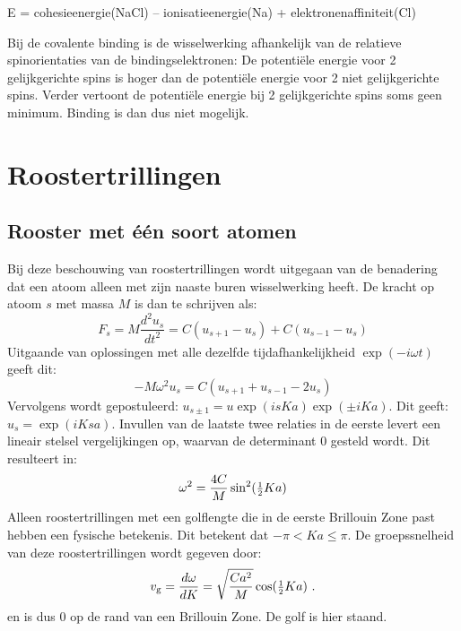 \documentclass[twoside]{report}
\begin{document}
\centerline{E = cohesieenergie(NaCl) -- ionisatieenergie(Na) + elektronenaffiniteit(Cl)}

Bij de covalente binding is de wisselwerking afhankelijk van de relatieve
spinorientaties van de bindingselektronen: De potenti\"ele energie voor 2
gelijkgerichte spins is hoger dan de potenti\"ele energie voor 2 niet
gelijkgerichte spins. Verder vertoont de potenti\"ele energie bij 2
gelijkgerichte spins soms geen minimum. Binding is dan dus niet mogelijk.

\section{Roostertrillingen}
\subsection{Rooster met \'e\'en soort atomen}
Bij deze beschouwing van roostertrillingen wordt uitgegaan van de benadering
dat een atoom alleen met zijn naaste buren wisselwerking heeft. De kracht op
atoom $s$ met massa $M$ is dan te schrijven als:
\[
F_s=M\frac{d^2u_s}{dt^2}=C(u_{s+1}-u_s)+C(u_{s-1}-u_s)
\]
Uitgaande van oplossingen met alle dezelfde tijdafhankelijkheid
$\exp(-i\omega t)$ geeft dit:
\[
-M\omega^2 u_s=C(u_{s+1}+u_{s-1}-2u_s)
\]
Vervolgens wordt gepostuleerd: $u_{s\pm1}=u\exp(isKa)\exp(\pm iKa)$.
\npar
Dit geeft: $u_s=\exp(iKsa)$. Invullen van de laatste twee relaties in de
eerste levert een lineair stelsel vergelijkingen op, waarvan de determinant 0
gesteld wordt. Dit resulteert in:
\[
\omega^2=\frac{4C}{M}\sin^2(\mbox{\small$\frac{1}{2}$}Ka)
\]
Alleen roostertrillingen met een golflengte die in de eerste Brillouin Zone
past hebben een fysische betekenis. Dit betekent dat $-\pi<Ka\leq\pi$.
\npar
De groepssnelheid van deze roostertrillingen wordt gegeven door:
\[
v_{\rm g}=\frac{d\omega}{dK}=\sqrt{\frac{Ca^2}{M}}\cos(\mbox{\small$\frac{1}{2}$}Ka)~.
\]
en is dus 0 op de rand van een Brillouin Zone. De golf is hier staand.
\end{document}
